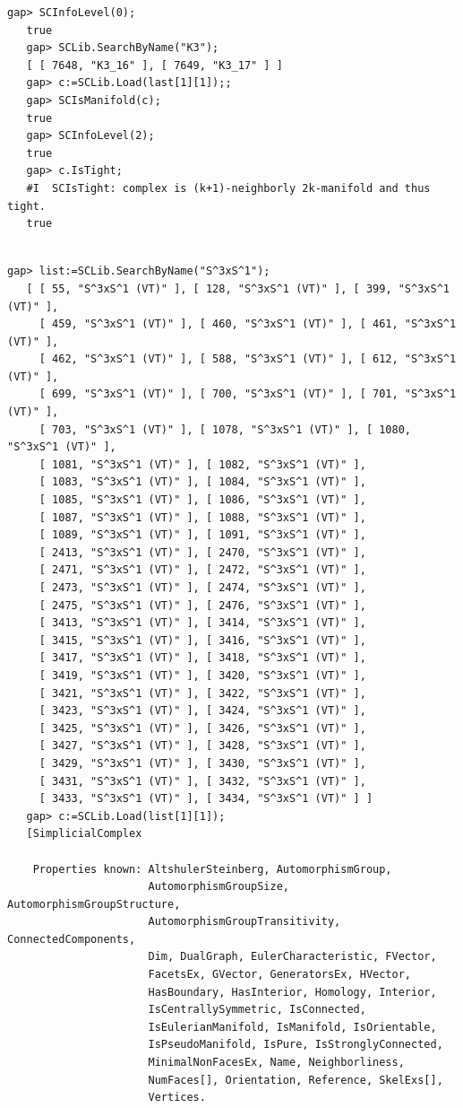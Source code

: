 \documentclass[a4paper,11pt]{report}
\begin{document}
{{{\begin{Verbatim}[commandchars=!@|,fontsize=\small,frame=single,label=Example]
   gap> SCInfoLevel(0);
   true
   gap> SCLib.SearchByName("K3");  
   [ [ 7648, "K3_16" ], [ 7649, "K3_17" ] ]
   gap> c:=SCLib.Load(last[1][1]);;
   gap> SCIsManifold(c);
   true
   gap> SCInfoLevel(2);
   true
   gap> c.IsTight;                 
   #I  SCIsTight: complex is (k+1)-neighborly 2k-manifold and thus tight.
   true
   
\end{Verbatim}
 
\begin{Verbatim}[commandchars=!@|,fontsize=\small,frame=single,label=Example]
   gap> list:=SCLib.SearchByName("S^3xS^1");
   [ [ 55, "S^3xS^1 (VT)" ], [ 128, "S^3xS^1 (VT)" ], [ 399, "S^3xS^1 (VT)" ], 
     [ 459, "S^3xS^1 (VT)" ], [ 460, "S^3xS^1 (VT)" ], [ 461, "S^3xS^1 (VT)" ], 
     [ 462, "S^3xS^1 (VT)" ], [ 588, "S^3xS^1 (VT)" ], [ 612, "S^3xS^1 (VT)" ], 
     [ 699, "S^3xS^1 (VT)" ], [ 700, "S^3xS^1 (VT)" ], [ 701, "S^3xS^1 (VT)" ], 
     [ 703, "S^3xS^1 (VT)" ], [ 1078, "S^3xS^1 (VT)" ], [ 1080, "S^3xS^1 (VT)" ],
     [ 1081, "S^3xS^1 (VT)" ], [ 1082, "S^3xS^1 (VT)" ], 
     [ 1083, "S^3xS^1 (VT)" ], [ 1084, "S^3xS^1 (VT)" ], 
     [ 1085, "S^3xS^1 (VT)" ], [ 1086, "S^3xS^1 (VT)" ], 
     [ 1087, "S^3xS^1 (VT)" ], [ 1088, "S^3xS^1 (VT)" ], 
     [ 1089, "S^3xS^1 (VT)" ], [ 1091, "S^3xS^1 (VT)" ], 
     [ 2413, "S^3xS^1 (VT)" ], [ 2470, "S^3xS^1 (VT)" ], 
     [ 2471, "S^3xS^1 (VT)" ], [ 2472, "S^3xS^1 (VT)" ], 
     [ 2473, "S^3xS^1 (VT)" ], [ 2474, "S^3xS^1 (VT)" ], 
     [ 2475, "S^3xS^1 (VT)" ], [ 2476, "S^3xS^1 (VT)" ], 
     [ 3413, "S^3xS^1 (VT)" ], [ 3414, "S^3xS^1 (VT)" ], 
     [ 3415, "S^3xS^1 (VT)" ], [ 3416, "S^3xS^1 (VT)" ], 
     [ 3417, "S^3xS^1 (VT)" ], [ 3418, "S^3xS^1 (VT)" ], 
     [ 3419, "S^3xS^1 (VT)" ], [ 3420, "S^3xS^1 (VT)" ], 
     [ 3421, "S^3xS^1 (VT)" ], [ 3422, "S^3xS^1 (VT)" ], 
     [ 3423, "S^3xS^1 (VT)" ], [ 3424, "S^3xS^1 (VT)" ], 
     [ 3425, "S^3xS^1 (VT)" ], [ 3426, "S^3xS^1 (VT)" ], 
     [ 3427, "S^3xS^1 (VT)" ], [ 3428, "S^3xS^1 (VT)" ], 
     [ 3429, "S^3xS^1 (VT)" ], [ 3430, "S^3xS^1 (VT)" ], 
     [ 3431, "S^3xS^1 (VT)" ], [ 3432, "S^3xS^1 (VT)" ], 
     [ 3433, "S^3xS^1 (VT)" ], [ 3434, "S^3xS^1 (VT)" ] ]
   gap> c:=SCLib.Load(list[1][1]);           
   [SimplicialComplex
   
    Properties known: AltshulerSteinberg, AutomorphismGroup, 
                      AutomorphismGroupSize, AutomorphismGroupStructure, 
                      AutomorphismGroupTransitivity, ConnectedComponents, 
                      Dim, DualGraph, EulerCharacteristic, FVector, 
                      FacetsEx, GVector, GeneratorsEx, HVector, 
                      HasBoundary, HasInterior, Homology, Interior, 
                      IsCentrallySymmetric, IsConnected, 
                      IsEulerianManifold, IsManifold, IsOrientable, 
                      IsPseudoManifold, IsPure, IsStronglyConnected, 
                      MinimalNonFacesEx, Name, Neighborliness, 
                      NumFaces[], Orientation, Reference, SkelExs[], 
                      Vertices.
   

\end{Verbatim}}}}
\end{document}
